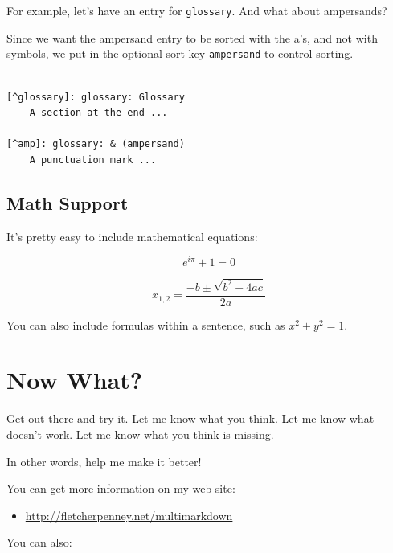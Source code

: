 For example, let's have an entry for \texttt{glossary}. And what about
ampersands?\glsadd{& }

Since we want the ampersand entry to be sorted with the a's, and not with
symbols, we put in the optional sort key \texttt{ampersand} to control sorting.

\begin{adjustwidth}{2.5em}{2.5em}
\begin{verbatim}

[^glossary]: glossary: Glossary 
    A section at the end ...

[^amp]: glossary: & (ampersand)
    A punctuation mark ...

\end{verbatim}
\end{adjustwidth}

\section{Math Support}
\label{mathsupport}

It's pretty easy to include mathematical equations:

\[ {e}^{i\pi }+1=0 \]

\[ {x}_{1,2}=\frac{-b\pm \sqrt{{b}^{2}-4ac}}{2a} \]

You can also include formulas within a sentence, such as
\({x}^{2}+{y}^{2}=1\).

\chapter{Now What?}
\label{nowwhat}

Get out there and try it. Let me know what you think. Let me know what doesn't
work. Let me know what you think is missing.

In other words, help me make it better!

You can get more information on my web site:

\begin{itemize}
\item \href{http://fletcherpenney.net/multimarkdown}{http:/\slash fletcherpenney.net\slash multimarkdown}

\end{itemize}

You can also:

